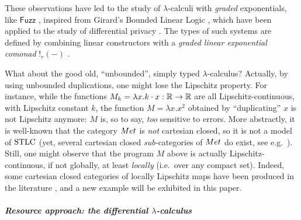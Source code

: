 These observations have led to the study of $\lambda$-calculi with \emph{graded} exponentials, like $\mathsf{Fuzz}$ \cite{Reed2010}, inspired from Girard's Bounded Linear Logic \cite{Girard92tcs}, which have been applied to the study of differential privacy \cite{Gaboardi2013, Gaboardi2017}. The types of such systems are defined by combining linear constructors with a \emph{graded linear exponential comonad} $!_{r}(-)$ \cite{Katsumata2018}.


What about the good old, ``unbounded'', simply typed $\lambda$-calculus? Actually, by using unbounded duplications, one might lose the Lipschitz property. For instance, while the functions $M_{k}=\lambda x. k\cdot x: \mathbb{R}\to \mathbb{R}$ are all Lipschitz-continuous, with Lipschitz constant $k$, the function $M=\lambda x.x^{2}$ obtained by ``duplicating'' $x$ is not Lipschitz anymore: $M$ is, so to say, \emph{too} sensitive to errors. 
More abstractly, it is well-known that the category $\Met$ is \emph{not} cartesian closed, so it is not a model of $\mathrm{STLC}$ (yet, several cartesian closed \emph{sub-}categories of $\Met$ do exist, see e.g.~\cite{Clementino2006, PistoneFSCD2022}).
Still, one might observe that the program $M$ above is actually Lipschitz-continuous, if not globally, at least \emph{locally} (i.e.~over any compact set). Indeed, some cartesian closed categories of locally Lipschitz maps have been produced in the literature \cite{Ehrhard2011, PistoneLICS}, and a new example will be exhibited in this paper.


\subparagraph*{Resource approach: the differential $\lambda$-calculus%
}

